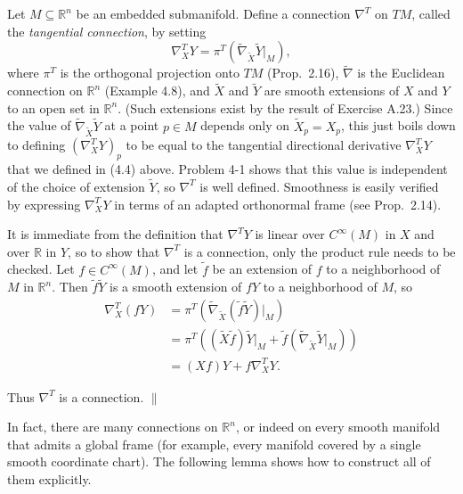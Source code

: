 \begin{example}
\label{ex:tangential-connection-submanifold}
Let $M \subseteq \mathbb{R}^n$ be an embedded submanifold. Define a connection $\nabla^T$ on $TM$, called the \emph{tangential connection}, by setting
\[
\nabla_X^T Y = \pi^T(\tilde{\nabla}_{\tilde{X}} \tilde{Y}|_M),
\]
where $\pi^T$ is the orthogonal projection onto $TM$ (Prop.\ 2.16), $\tilde{\nabla}$ is the Euclidean connection on $\mathbb{R}^n$ (Example 4.8), and $\tilde{X}$ and $\tilde{Y}$ are smooth extensions of $X$ and $Y$ to an open set in $\mathbb{R}^n$. (Such extensions exist by the result of Exercise A.23.) Since the value of $\tilde{\nabla}_{\tilde{X}} \tilde{Y}$ at a point $p \in M$ depends only on $\tilde{X}_p = X_p$, this just boils down to defining $(\nabla_X^T Y)_p$ to be equal to the tangential directional derivative $\nabla_X^T Y$ that we defined in (4.4) above. Problem 4-1 shows that this value is independent of the choice of extension $\tilde{Y}$, so $\nabla^T$ is well defined. Smoothness is easily verified by expressing $\nabla_X^T Y$ in terms of an adapted orthonormal frame (see Prop.\ 2.14).

It is immediate from the definition that $\nabla^T Y$ is linear over $C^\infty(M)$ in $X$ and over $\mathbb{R}$ in $Y$, so to show that $\nabla^T$ is a connection, only the product rule needs to be checked. Let $f \in C^\infty(M)$, and let $\tilde{f}$ be an extension of $f$ to a neighborhood of $M$ in $\mathbb{R}^n$. Then $\tilde{f}\tilde{Y}$ is a smooth extension of $fY$ to a neighborhood of $M$, so
\begin{align*}
\nabla_X^T(fY) &= \pi^T(\tilde{\nabla}_{\tilde{X}}(\tilde{f}\tilde{Y})|_M) \\
&= \pi^T((\tilde{X}\tilde{f})\tilde{Y}|_M + \tilde{f}(\tilde{\nabla}_{\tilde{X}}\tilde{Y}|_M)) \\
&= (Xf)Y + f\nabla_X^T Y.
\end{align*}

Thus $\nabla^T$ is a connection. \hfill $\parallel$
\end{example}

In fact, there are many connections on $\mathbb{R}^n$, or indeed on every smooth manifold that admits a global frame (for example, every manifold covered by a single smooth coordinate chart). The following lemma shows how to construct all of them explicitly.

